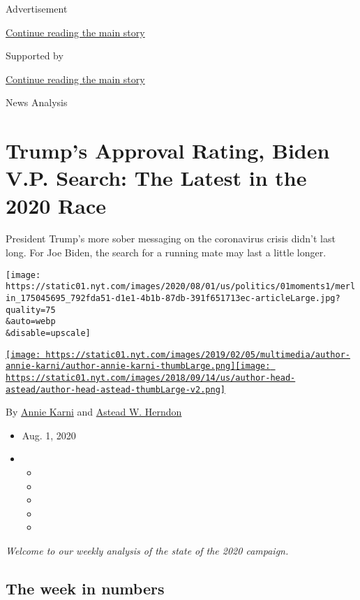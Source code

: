 Advertisement

\protect\hyperlink{after-top}{Continue reading the main story}

Supported by

\protect\hyperlink{after-sponsor}{Continue reading the main story}

News Analysis

\hypertarget{trumps-approval-rating-biden-vp-search-the-latest-in-the-2020-race}{%
\section{Trump's Approval Rating, Biden V.P. Search: The Latest in the
2020
Race}\label{trumps-approval-rating-biden-vp-search-the-latest-in-the-2020-race}}

President Trump's more sober messaging on the coronavirus crisis didn't
last long. For Joe Biden, the search for a running mate may last a
little longer.

\texttt{[image: https://static01.nyt.com/images/2020/08/01/us/politics/01moments1/merlin\_175045695\_792fda51-d1e1-4b1b-87db-391f651713ec-articleLarge.jpg?quality=75\\\&auto=webp\\\&disable=upscale]}

\href{https://www.nytimes.com/by/annie-karni}{\texttt{[image: https://static01.nyt.com/images/2019/02/05/multimedia/author-annie-karni/author-annie-karni-thumbLarge.png]}}\href{https://www.nytimes.com/by/astead-w-herndon}{\texttt{[image: https://static01.nyt.com/images/2018/09/14/us/author-head-astead/author-head-astead-thumbLarge-v2.png]}}

By \href{https://www.nytimes.com/by/annie-karni}{Annie Karni} and
\href{https://www.nytimes.com/by/astead-w-herndon}{Astead W. Herndon}

\begin{itemize}
\item
  Aug. 1, 2020
\item
  \begin{itemize}
  \item
  \item
  \item
  \item
  \item
  \end{itemize}
\end{itemize}

\emph{Welcome to our weekly analysis of the state of the 2020 campaign.}

\hypertarget{the-week-in-numbers}{%
\subsection{The week in numbers}\label{the-week-in-numbers}}

